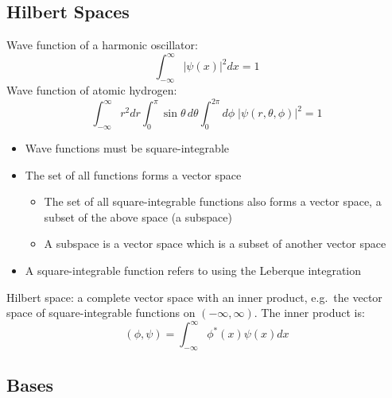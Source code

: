 \documentclass[a4paper,11pt,normalem]{article}
\begin{document}
\subsection{Hilbert Spaces}\label{hilbert-spaces}

Wave function of a harmonic oscillator:
\[
    \int_{-\infty}^\infty |\psi(x)|^2dx = 1
\]
Wave function of atomic hydrogen:
\[
    \int_{-\infty}^\infty r^2dr \int_{0}^\pi \sin\theta\,d\theta \int_0^{2\pi} d\phi \; |\psi(r,\theta,\phi)|^2 = 1
\]

\begin{itemize}
\item
  Wave functions must be square-integrable
\item
  The set of all functions forms a vector space
  \begin{itemize}
  \item
    The set of all square-integrable functions also forms a vector
    space, a subset of the above space (a subspace)
  \item
    A subspace is a vector space which is a subset of another vector
    space
  \end{itemize}
\item
  A square-integrable function refers to using the Leberque integration
\end{itemize}
Hilbert space: a complete vector space with an inner product, e.g.~the
vector space of square-integrable functions on \((-\infty, \infty)\).
The inner product is:
\[
    (\phi, \psi) = \int_{-\infty}^\infty \phi^* (x)\psi(x)dx
\]

\subsection{Bases}\label{bases}
\end{document}
